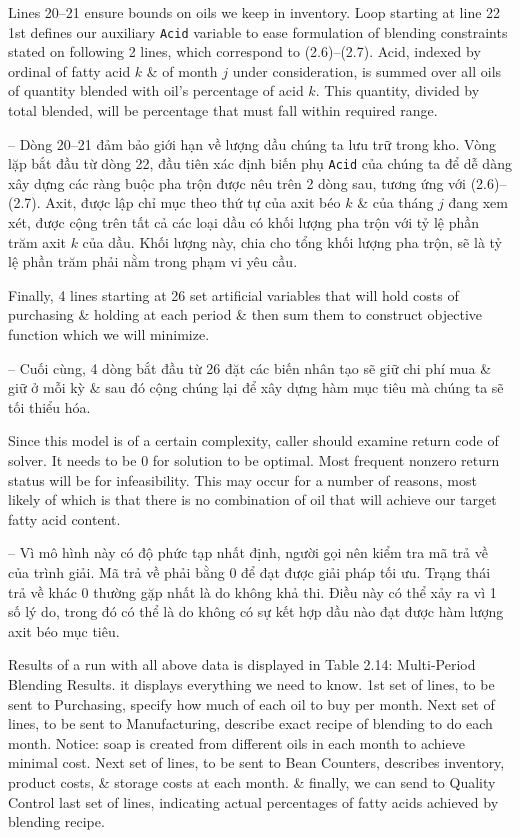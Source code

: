 \documentclass{article}
\begin{document}
\begin{itemize}
\begin{itemize}
\begin{itemize}
\begin{itemize}
                Lines 20--21 ensure bounds on oils we keep in inventory. Loop starting at line 22 1st defines our auxiliary {\tt Acid} variable to ease formulation of blending constraints stated on following 2 lines, which correspond to (2.6)--(2.7). Acid, indexed by ordinal of fatty acid $k$ \& of month $j$ under consideration, is summed over all oils of quantity blended with oil's percentage of acid $k$. This quantity, divided by total blended, will be percentage that must fall within required range.

                -- Dòng 20--21 đảm bảo giới hạn về lượng dầu chúng ta lưu trữ trong kho. Vòng lặp bắt đầu từ dòng 22, đầu tiên xác định biến phụ {\tt Acid} của chúng ta để dễ dàng xây dựng các ràng buộc pha trộn được nêu trên 2 dòng sau, tương ứng với (2.6)--(2.7). Axit, được lập chỉ mục theo thứ tự của axit béo $k$ \& của tháng $j$ đang xem xét, được cộng trên tất cả các loại dầu có khối lượng pha trộn với tỷ lệ phần trăm axit $k$ của dầu. Khối lượng này, chia cho tổng khối lượng pha trộn, sẽ là tỷ lệ phần trăm phải nằm trong phạm vi yêu cầu.

                Finally, 4 lines starting at 26 set artificial variables that will hold costs of purchasing \& holding at each period \& then sum them to construct objective function which we will minimize.

                -- Cuối cùng, 4 dòng bắt đầu từ 26 đặt các biến nhân tạo sẽ giữ chi phí mua \& giữ ở mỗi kỳ \& sau đó cộng chúng lại để xây dựng hàm mục tiêu mà chúng ta sẽ tối thiểu hóa.

                Since this model is of a certain complexity, caller should examine return code of solver. It needs to be 0 for solution to be optimal. Most frequent nonzero return status will be for infeasibility. This may occur for a number of reasons, most likely of which is that there is no combination of oil that will achieve our target fatty acid content.

                -- Vì mô hình này có độ phức tạp nhất định, người gọi nên kiểm tra mã trả về của trình giải. Mã trả về phải bằng 0 để đạt được giải pháp tối ưu. Trạng thái trả về khác 0 thường gặp nhất là do không khả thi. Điều này có thể xảy ra vì 1 số lý do, trong đó có thể là do không có sự kết hợp dầu nào đạt được hàm lượng axit béo mục tiêu.

                Results of a run with all above data is displayed in {\sf Table 2.14: Multi-Period Blending Results}. it displays everything we need to know. 1st set of lines, to be sent to Purchasing, specify how much of each oil to buy per month. Next set of lines, to be sent to Manufacturing, describe exact recipe of blending to do each month. Notice: soap is created from different oils in each month to achieve minimal cost. Next set of lines, to be sent to Bean Counters, describes inventory, product costs, \& storage costs at each month. \& finally, we can send to Quality Control last set of lines, indicating actual percentages of fatty acids achieved by blending recipe.


\end{itemize}
\end{itemize}
\end{itemize}
\end{itemize}
\end{document}
